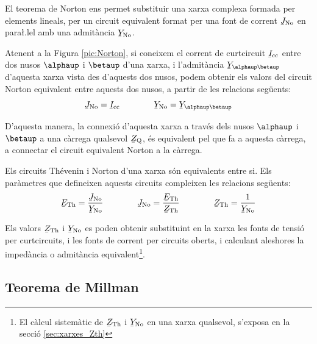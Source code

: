 El teorema de Norton ens permet substituir
una xarxa complexa formada per elements lineals, per un circuit
equivalent format per una font de corrent $\cmplx{J}\ped{No}$ en
para{\l.l}el amb una admit\`{a}ncia $\cmplx{Y}\ped{No}$.

Atenent a la Figura \vref{pic:Norton}, si coneixem el corrent de
curtcircuit $\cmplx{I}\ped{cc}$ entre dos nusos $\alphaup$ i $\betaup$
d'una xarxa, i l'admit\`{a}ncia $\cmplx{Y}_{\alphaup\betaup}$ d'aquesta
xarxa vista des d'aquests dos nusos, podem obtenir els valors del
circuit Norton equivalent entre aquests dos nusos, a partir de les
relacions seg\"{u}ents:
\begin{equation}
   \cmplx{J}\ped{No} = \cmplx{I}\ped{cc} \qquad\qquad \cmplx{Y}\ped{No} = \cmplx{Y}_{\alphaup\betaup}
\end{equation}

D'aquesta manera, la connexi\'{o} d'aquesta xarxa a trav\'{e}s dels nusos
$\alphaup$ i $\betaup$ a una c\`{a}rrega qualsevol $\cmplx{Z}\ped{Q}$, \'{e}s
equivalent pel que fa a aquesta c\`{a}rrega, a connectar el circuit
equivalent Norton a la c\`{a}rrega.
\begin{center}
    
    \label{pic:Norton}
\end{center}

Els circuits Th\'{e}venin i Norton d'una xarxa s\'{o}n equivalents entre si.
Els par\`{a}metres que defineixen aquests circuits compleixen les relacions
seg\"{u}ents:
\begin{equation}\label{eq:Thevenin-Norton}
   \cmplx{E}\ped{Th} = \frac{\cmplx{J}\ped{No}}{\cmplx{Y}\ped{No}} \qquad\qquad
   \cmplx{J}\ped{No} = \frac{\cmplx{E}\ped{Th}}{\cmplx{Z}\ped{Th}} \qquad\qquad
    \cmplx{Z}\ped{Th} = \frac{1}{\cmplx{Y}\ped{No}}
\end{equation}

Els valors $\cmplx{Z}\ped{Th}$ i  $\cmplx{Y}\ped{No}$ es poden
obtenir substituint en la xarxa  les fonts de tensi\'{o}  per curtcircuits, i les fonts de corrent per circuits oberts, i calculant
aleshores la imped\`{a}ncia o admit\`{a}ncia equivalent\footnote{El c\`{a}lcul sistem\`{a}tic de $\cmplx{Z}\ped{Th}$ i  $\cmplx{Y}\ped{No}$ en una xarxa qualsevol, s'exposa en la secci\'{o} \ref{sec:xarxes_Zth}}.

\subsection{Teorema de Millman}\label{sec:millman}


